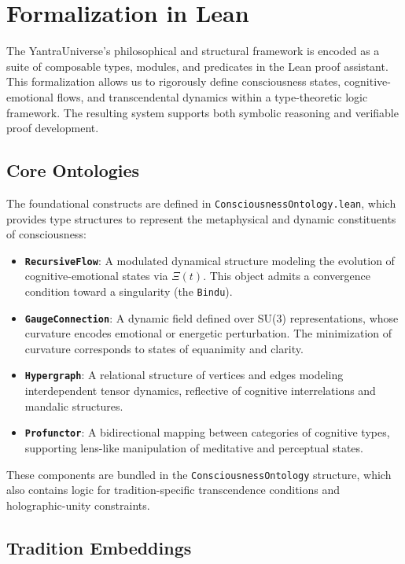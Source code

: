 \documentclass[12pt]{article}
\theoremstyle{plain}
\begin{document}
\section{Formalization in Lean}

The YantraUniverse's philosophical and structural framework is encoded as a suite of composable types, modules, and predicates in the Lean proof assistant. This formalization allows us to rigorously define consciousness states, cognitive-emotional flows, and transcendental dynamics within a type-theoretic logic framework. The resulting system supports both symbolic reasoning and verifiable proof development.

\subsection{Core Ontologies}

The foundational constructs are defined in \texttt{ConsciousnessOntology.lean}, which provides type structures to represent the metaphysical and dynamic constituents of consciousness:

\begin{itemize}
    \item \textbf{\texttt{RecursiveFlow}}: A modulated dynamical structure modeling the evolution of cognitive-emotional states via $\Xi(t)$. This object admits a convergence condition toward a singularity (the \texttt{Bindu}).
    \item \textbf{\texttt{GaugeConnection}}: A dynamic field defined over SU(3) representations, whose curvature encodes emotional or energetic perturbation. The minimization of curvature corresponds to states of equanimity and clarity.
    \item \textbf{\texttt{Hypergraph}}: A relational structure of vertices and edges modeling interdependent tensor dynamics, reflective of cognitive interrelations and mandalic structures.
    \item \textbf{\texttt{Profunctor}}: A bidirectional mapping between categories of cognitive types, supporting lens-like manipulation of meditative and perceptual states.
\end{itemize}

These components are bundled in the \texttt{ConsciousnessOntology} structure, which also contains logic for tradition-specific transcendence conditions and holographic-unity constraints.

\subsection{Tradition Embeddings}
\end{document}
